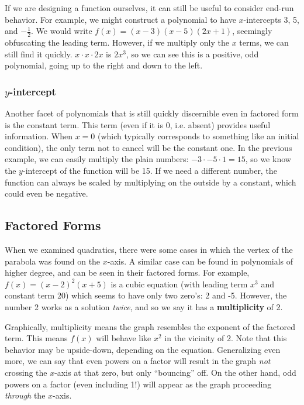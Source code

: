 If we are designing a function ourselves, it can still be useful to consider
end-run behavior.  For example, we might construct a polynomial to have
$x$-intercepts 3, 5, and $-\frac{1}{2}$.  We would write $f(x)=(x-3)(x-5)(2x+1)$,
seemingly obfuscating the leading term.  However, if we multiply only the $x$ terms,
we can still find it quickly.  $x \cdot x \cdot 2x$ is $2x^3$, so we can see this is
a positive, odd polynomial, going up to the right and down to the left.

\subsubsection{$y$-intercept}
Another facet of polynomials that is still quickly discernible even in factored form
is the constant term.  This term (even if it is 0, i.e. absent) provides useful information.
When $x=0$ (which typically corresponds to something like an initial condition), the
only term not to cancel will be the constant one.  In the previous example, we can 
easily multiply the plain numbers: $-3 \cdot -5 \cdot 1 = 15$, so we know the
$y$-intercept of the function will be 15.  If we need a different number, the function
can always be scaled by multiplying on the outside by a constant, which could even
be negative.

\subsection{Factored Forms}
When we examined quadratics, there were some cases in which the vertex of the
parabola was found on the $x$-axis.  A similar case can be found in polynomials of
higher degree, and can be seen in their factored forms.  For example,
$f(x)= (x-2)^2(x+5)$ is a cubic equation  (with leading term $x^3$ and constant term
20) which seems to have only two zero's: 2 and -5.  However, the number 2 works as
a solution \emph{twice}, and so we say it has a \textbf{multiplicity} of 2.

Graphically, multiplicity means the graph resembles the exponent of the factored term.
This means $f(x)$ will behave like $x^2$ in the vicinity of 2.  Note that this behavior
may be upside-down, depending on the equation.  Generalizing even more, we can say
that even powers on a factor will result in the graph \emph{not} crossing the $x$-axis
at that zero, but only ``bouncing'' off.  On the other hand, odd powers on a factor
(even including 1!) will appear as the graph proceeding \emph{through} the $x$-axis.

